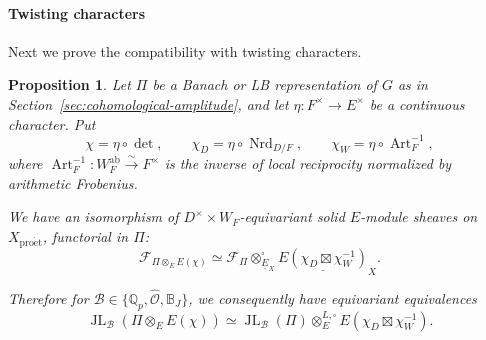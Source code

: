 \documentclass[11pt]{article}
\newtheorem{proposition}[theorem]{Proposition}
\theoremstyle{definition}
\newcommand{\Qp}{\mathbb Q_p}
\newcommand{\cF}{\mathcal F}
\newcommand{\proet}{\mathrm{pro\acute et}}
\newcommand{\JL}{\operatorname{JL}}
\begin{document}
\paragraph{Twisting characters} Next we prove the compatibility with twisting characters. 
\begin{proposition}
\label{prop:JL-character-twist}
Let \(\Pi\) be a Banach or LB representation of \(G\) as in
Section~\ref{sec:cohomological-amplitude}, and let
\(\eta:F^\times\to E^\times\) be a continuous character. Put
\[
 \chi=\eta\circ\det,\qquad
 \chi_D=\eta\circ\operatorname{Nrd}_{D/F},\qquad
 \chi_W=\eta\circ\operatorname{Art}_F^{-1},
\]
where \(\operatorname{Art}_F^{-1}:W_F^{\mathrm{ab}}\xrightarrow{\sim}F^\times\)
is the inverse of local reciprocity normalized by arithmetic Frobenius.

We have an isomorphism of \(D^\times\times W_F\)-equivariant
solid \(E\)-module sheaves on \(X_{\proet}\), functorial in \(\Pi\):
\[
 \cF_{\Pi\otimes_E E(\chi)}
 \simeq
 \cF_\Pi\otimes_{\underline E_X}^{\square}
 \underline{E(\chi_D\boxtimes\chi_W^{-1})}_X.
\]

Therefore for \(\mathscr B\in\{\Qp,\widehat{\mathscr O},\mathbb B_J\}\),
we consequently have equivariant equivalences
\[
 \JL_{\mathscr B}(\Pi\otimes_E E(\chi))
 \simeq
 \JL_{\mathscr B}(\Pi)\otimes_E^{L,\square}
 E(\chi_D\boxtimes\chi_W^{-1}).
\]
\end{proposition}
\end{document}
